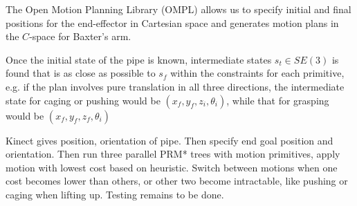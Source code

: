 \documentclass[runningheads,letterpaper]{llncs}
\begin{document}
The Open Motion Planning Library (OMPL) allows us to specify initial and final positions for the end-effector in Cartesian space and generates motion plans in the $C$-space for Baxter's arm.  

Once the initial state of the pipe is known, intermediate states $s_t \in SE(3)$ is found that is as close as possible to $s_f$ within the constraints for each primitive, e.g. if the plan involves pure translation in all three directions, the intermediate state for caging or pushing would be $(x_f,y_f,z_i,\theta_i)$, while that for grasping would be $(x_f,y_f,z_f,\theta_i)$ 

Kinect gives position, orientation of pipe. Then specify end goal position and orientation. Then run three parallel PRM* trees with motion primitives, apply motion with lowest cost based on heuristic. Switch between motions when one cost becomes lower than others, or other two become intractable, like pushing or caging when lifting up. Testing remains to be done.





\end{document}
